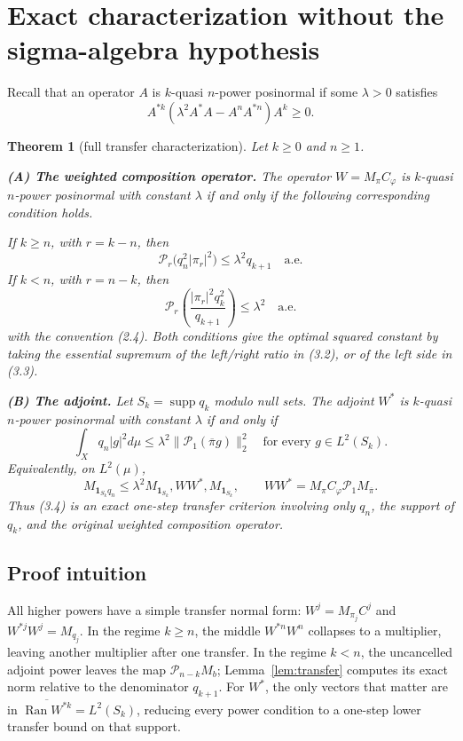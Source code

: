 \documentclass[11pt]{article}
\newtheorem{theorem}{Theorem}
\newcommand{\Perr}{\mathcal P}
\newcommand{\1}{\mathbf 1}
\newcommand{\supp}{\operatorname{supp}}
\newcommand{\Ran}{\operatorname{Ran}}
\begin{document}
\section{Exact characterization without the sigma-algebra hypothesis}

Recall that an operator $A$ is $k$-quasi $n$-power posinormal if some
$\lambda>0$ satisfies
\[
 A^{*k}(\lambda^2A^*A-A^nA^{*n})A^k\ge0.
 \tag{3.1}
\]

\begin{theorem}[full transfer characterization]\label{thm:main}
Let $k\ge0$ and $n\ge1$.

\smallskip
\noindent\textbf{(A) The weighted composition operator.}
The operator $W=M_\pi C_\varphi$ is $k$-quasi $n$-power posinormal with
constant $\lambda$ if and only if the following corresponding condition holds.

If $k\ge n$, with $r=k-n$, then
\[
 \boxed{\quad
 \Perr_r\bigl(q_n^2|\pi_r|^2\bigr)
 \le\lambda^2q_{k+1}\quad\text{a.e.}
 \quad} \tag{3.2}
\]
If $k<n$, with $r=n-k$, then
\[
 \boxed{\quad
 \Perr_r\left(
   \frac{|\pi_r|^2q_k^2}{q_{k+1}}
 \right)\le\lambda^2\quad\text{a.e.}
 \quad} \tag{3.3}
\]
with the convention (2.4).  Both conditions give the optimal squared
constant by taking the essential supremum of the left/right ratio in (3.2),
or of the left side in (3.3).

\smallskip
\noindent\textbf{(B) The adjoint.}
Let $S_k=\supp q_k$ modulo null sets.  The adjoint $W^*$ is $k$-quasi
$n$-power posinormal with constant $\lambda$ if and only if
\[
 \boxed{\quad
 \int_Xq_n|g|^2d\mu
 \le\lambda^2\|\Perr_1(\overline\pi g)\|_2^2
 \quad\text{for every }g\in L^2(S_k).
 \quad} \tag{3.4}
\]
Equivalently, on $L^2(\mu)$,
\[
 M_{\1_{S_k}q_n}
 \le\lambda^2 M_{\1_{S_k}},W W^*,M_{\1_{S_k}},
 \qquad
 WW^*=M_\pi C_\varphi\Perr_1M_{\overline\pi}. \tag{3.5}
\]
Thus (3.4) is an exact one-step transfer criterion involving only $q_n$, the
support of $q_k$, and the original weighted composition operator.
\end{theorem}

\subsection*{Proof intuition}
All higher powers have a simple transfer normal form:
$W^j=M_{\pi_j}C^j$ and $W^{*j}W^j=M_{q_j}$.  In the regime $k\ge n$, the
middle $W^{*n}W^n$ collapses to a multiplier, leaving another multiplier after
one transfer.  In the regime $k<n$, the uncancelled adjoint power leaves the
map $\Perr_{n-k}M_b$; Lemma~\ref{lem:transfer} computes its exact norm relative
to the denominator $q_{k+1}$.  For $W^*$, the only vectors that matter are in
$\overline{\Ran W^{*k}}=L^2(S_k)$, reducing every power condition to a
one-step lower transfer bound on that support.
\end{document}
